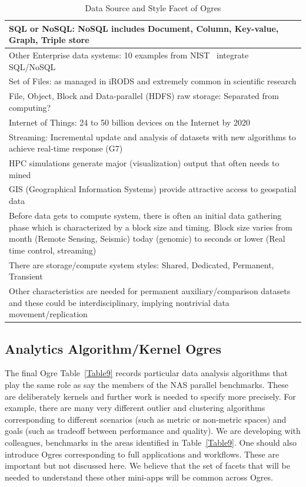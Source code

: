 \documentclass{acm_proc_article-sp}
\begin{document}
\begin{table}[H]
\centering
\caption{Data Source and Style Facet of Ogres}
\label{Table8}
\begin{tabular}{|p{8cm}|} \hline
SQL or NoSQL: NoSQL includes Document, Column, Key-value, Graph, Triple store \\ \hline
Other Enterprise data systems: 10 examples from NIST~\cite{bb} integrate SQL/NoSQL \\ \hline
Set of Files: as managed in iRODS and extremely common in scientific research \\ \hline
File, Object, Block and Data-parallel (HDFS) raw storage: Separated from computing? \\ \hline
Internet of Things: 24 to 50 billion devices on the Internet by 2020~\cite{b22,b11,b12} \\ \hline
Streaming: Incremental update and analysis of datasets with new algorithms to achieve real-time response (G7) \\ \hline
HPC simulations generate major (visualization) output that often needs to mined \\ \hline
GIS (Geographical Information Systems) provide attractive access to geospatial data \\ \hline
Before data gets to compute system, there is often an initial data gathering phase which is characterized by a block size and timing. Block size varies from month (Remote Sensing, Seismic) today (genomic) to seconds or lower (Real time control, streaming)\\ \hline
There are storage/compute system styles: Shared, Dedicated, Permanent, Transient \\ \hline
Other characteristics are needed for permanent auxiliary/comparison datasets and these could be interdisciplinary, implying nontrivial data movement/replication
\\ \hline
\end{tabular}
\end{table}



\subsection{Analytics Algorithm/Kernel Ogres}

The final Ogre Table~\ref{Table9} records particular data analysis algorithms
that play the same role as say the members of the NAS parallel benchmarks.
These are deliberately kernels and further work is needed to specify more
precisely. For example, there are many very different outlier and clustering
algorithms corresponding to different scenarios (such as metric or non-metric
spaces) and goals (such as tradeoff between performance and quality). We are
developing with colleagues, benchmarks in the areas identified in
Table~\ref{Table9}. One should also introduce Ogres corresponding to full
applications and workflows. These are important but not discussed here. We
believe that the set of facets that will be needed to understand these other
mini-apps will be common across Ogres.
\end{document}
